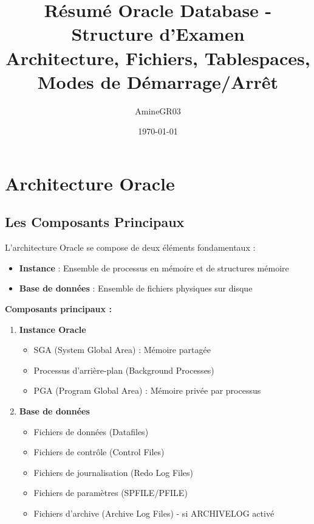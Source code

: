 \documentclass[11pt,a4paper]{article}
\title{Résumé Oracle Database - Structure d'Examen\\
\large Architecture, Fichiers, Tablespaces, Modes de Démarrage/Arrêt}
\author{AmineGR03}
\date{\today}
\begin{document}
\maketitle

\tableofcontents
\newpage

\section{Architecture Oracle}

\subsection{Les Composants Principaux}

\begin{definitionbox}
L'architecture Oracle se compose de deux éléments fondamentaux :
\begin{itemize}
    \item \textbf{Instance} : Ensemble de processus en mémoire et de structures mémoire
    \item \textbf{Base de données} : Ensemble de fichiers physiques sur disque
\end{itemize}
\end{definitionbox}

\textbf{Composants principaux :}

\begin{enumerate}
    \item \textbf{Instance Oracle}
    \begin{itemize}
        \item SGA (System Global Area) : Mémoire partagée
        \item Processus d'arrière-plan (Background Processes)
        \item PGA (Program Global Area) : Mémoire privée par processus
    \end{itemize}
    
    \item \textbf{Base de données}
    \begin{itemize}
        \item Fichiers de données (Datafiles)
        \item Fichiers de contrôle (Control Files)
        \item Fichiers de journalisation (Redo Log Files)
        \item Fichiers de paramètres (SPFILE/PFILE)
        \item Fichiers d'archive (Archive Log Files) - si ARCHIVELOG activé
    \end{itemize}
\end{enumerate}
\end{document}

